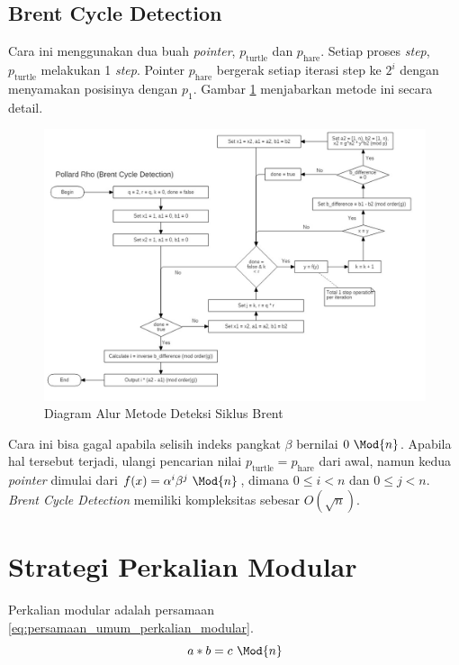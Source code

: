 \subsection{Brent Cycle Detection}
Cara ini menggunakan dua buah \textit{pointer}, $ p_{\text{turtle}} $ dan $ p_{\text{hare}} $. Setiap proses \textit{step}, $ p_{\text{turtle}} $ melakukan 1 \textit{step}. Pointer $ p_{\text{hare}} $ bergerak setiap iterasi step ke $ 2^i $ dengan menyamakan posisinya dengan $ p_1 $. Gambar \ref{fig:brent_pollard_rho} menjabarkan metode ini secara detail.
\begin{figure}[h!]
	\Centering
	\includegraphics[scale=0.4,angle=90]{bab2/img/pollard-rho-brent}
	\caption {Diagram Alur Metode Deteksi Siklus Brent}
	\label{fig:brent_pollard_rho}
\end{figure}

Cara ini bisa gagal apabila selisih indeks pangkat $ \beta $ bernilai $ 0\ \Mod{n} $. Apabila hal tersebut terjadi, ulangi pencarian nilai $ p_{\text{turtle}} = p_{\text{hare}} $ dari awal, namun kedua \textit{pointer} dimulai dari $ f(x)=\alpha^i \beta^j\ \Mod{n} $, dimana $ 0 \leq i < n $ dan $ 0 \leq j < n $. \textit{Brent Cycle Detection} memiliki kompleksitas sebesar $ O(\sqrt{n}) $.

\section{Strategi Perkalian Modular}

Perkalian modular adalah persamaan \eqref{eq:persamaan_umum_perkalian_modular}.
\begin{equation}
a*b=c\ \Mod{n}
\label{eq:persamaan_umum_perkalian_modular}
\end{equation}

